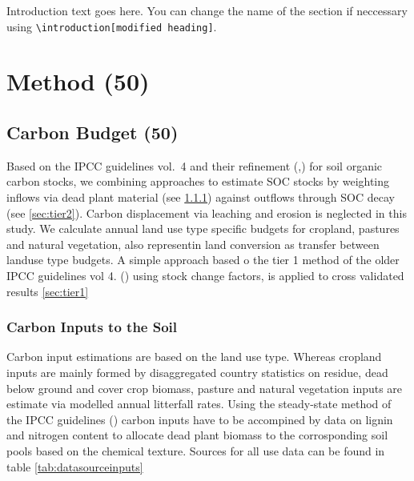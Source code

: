 \documentclass[gc, manuscript]{copernicus}
\begin{document}


\introduction

Introduction text goes here. You can change the name of the section if
neccessary using
\texttt{\textbackslash{}introduction{[}modified\ heading{]}}.

\section{Method (50)}

\subsection{Carbon Budget (50)}

Based on the IPCC guidelines vol.~4 and their refinement
(\citep{ipcc_2006_2006},\citep{ipcc_2019_2019}) for soil organic carbon
stocks, we combining approaches to estimate SOC stocks by weighting
inflows via dead plant material (see \ref{sec:carboninputs}) against
outflows through SOC decay (see \ref{sec:tier2}). Carbon displacement
via leaching and erosion is neglected in this study. We calculate annual
land use type specific budgets for cropland, pastures and natural
vegetation, also representin land conversion as transfer between landuse
type budgets. A simple approach based o the tier 1 method of the older
IPCC guidelines vol 4. (\citet{ipcc_2006_2006}) using stock change
factors, is applied to cross validated results \ref{sec:tier1}

\subsubsection{Carbon Inputs to the Soil}\label{sec:carboninputs}

Carbon input estimations are based on the land use type. Whereas
cropland inputs are mainly formed by disaggregated country statistics on
residue, dead below ground and cover crop biomass, pasture and natural
vegetation inputs are estimate via modelled annual litterfall rates.
Using the steady-state method of the IPCC guidelines
(\citep{ipcc_2019_2019}) carbon inputs have to be accompined by data on
lignin and nitrogen content to allocate dead plant biomass to the
corrosponding soil pools based on the chemical texture. Sources for all
use data can be found in table \ref{tab:datasourceinputs}
\end{document}
